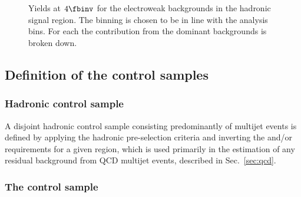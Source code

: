 \begin{figure}[h!]
  \\
  \\
  \caption{\label{fig:ewkYields} Yields at $4\fbinv$ for the electroweak backgrounds in the
  hadronic signal region. The binning is chosen to be in line with the analysis
  bins. For each \njet the contribution from the dominant backgrounds is broken
  down.}
\end{figure}


\subsection{Definition of the control samples}
\label{sec:controlSelection}

\subsubsection{Hadronic control sample}

A disjoint hadronic control sample consisting predominantly of
multijet events is defined by applying the hadronic pre-selection
criteria and inverting the \alphat and/or \mhtmet requirements for a
given \scalht region, which is used primarily in the estimation of any
residual background from QCD multijet events, described in
Sec.~\ref{sec:qcd}.

\subsubsection{The \texorpdfstring{\mj}{muon plus jets} control sample}

